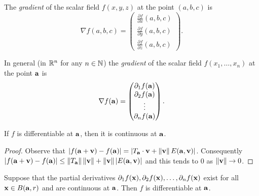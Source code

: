 %
\begin{definition}[gradient]
    The \emph{gradient} of the scalar field \(f(x,y,z)\) at the point \((a,b,c)\) is
    \[
        \nabla f(a,b,c) =
        \begin{pmatrix}
            \frac{\partial f}{\partial x}(a,b,c) \\[2pt]
            \frac{\partial f}{\partial y}(a,b,c) \\[2pt]
            \frac{\partial f}{\partial z}(a,b,c)
        \end{pmatrix}.
    \]
\end{definition}
%
\noindent
In general (in \(\bR^n\) for any \(n\in\bN\)) the \emph{gradient} of the scalar field \(f(x_1,\ldots,x_n)\) at the point \(\aa\) is
\[
    \nabla f(\aa) =
    \begin{pmatrix}
        \partial_1 f(\aa) \\
        \partial_2 f(\aa) \\
        \vdots            \\
        \partial_nf(\aa)
    \end{pmatrix}.
\]

\begin{theorem*}
    If \(f\) is differentiable at \(\aa\), then it is continuous at \(\aa\).
\end{theorem*}
\begin{proof}
    Observe that \(\abs{f(\aa+\vv)-f(\aa)} = \abs{ T_\aa \cdot \vv + \norm{\vv}E(\aa,\vv)}\).
    Consequently \( \abs{f(\aa+\vv)-f(\aa)} \leq \norm{T_\aa } \norm{\vv} + \norm{\vv} \abs{E(\aa,\vv)} \) and this tends to \(0\) as \(\norm{\vv} \to 0\).
\end{proof}

\begin{theorem}
    Suppose that the partial derivatives \(\partial_1 f(\xx), \partial_2 f(\xx), \ldots, \partial_nf(\xx)\) exist for all \(\xx\in B(\aa,r)\) and are continuous at \(\aa\).
    Then \(f\) is differentiable at \(\aa\).
\end{theorem}

